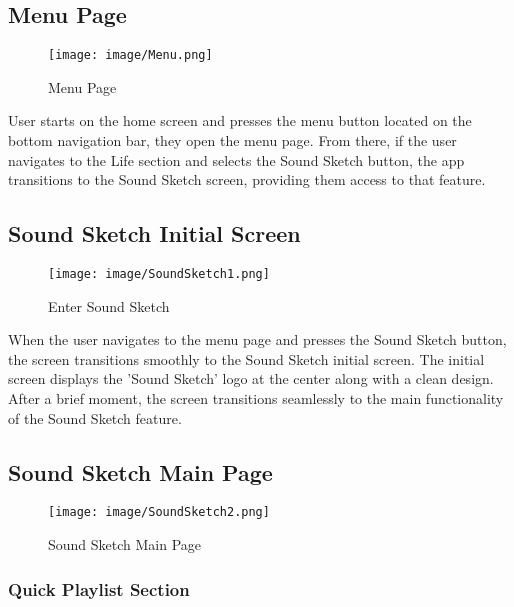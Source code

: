 \documentclass[conference]{IEEEtran}
\begin{document}
\subsection{Menu Page}

\begin{figure}[h!]
    \centering
    \texttt{[image: image/Menu.png]}
    \caption{Menu Page}
    \label{fig:enter-label}
\end{figure}

\noindent User starts on the home screen and presses the menu button located on the bottom navigation bar, they open the menu page. From there, if the user navigates to the Life section and selects the Sound Sketch button, the app transitions to the Sound Sketch screen, providing them access to that feature. \\

\subsection{Sound Sketch Initial Screen}


\begin{figure}[h!]
    \centering
    \texttt{[image: image/SoundSketch1.png]}
    \caption{Enter Sound Sketch}
    \label{fig:enter-label}
\end{figure}

\noindent 
When the user navigates to the menu page and presses the Sound Sketch button, the screen transitions smoothly to the Sound Sketch initial screen. The initial screen displays the 'Sound Sketch' logo at the center along with a clean design. After a brief moment, the screen transitions seamlessly to the main functionality of the Sound Sketch feature. \\

\clearpage

\subsection{Sound Sketch Main Page}

\begin{figure}[h!]
    \centering
    \texttt{[image: image/SoundSketch2.png]}
    \caption{Sound Sketch Main Page}
    \label{fig:enter-label}
\end{figure}

\subsubsection{Quick Playlist Section}
\end{document}
